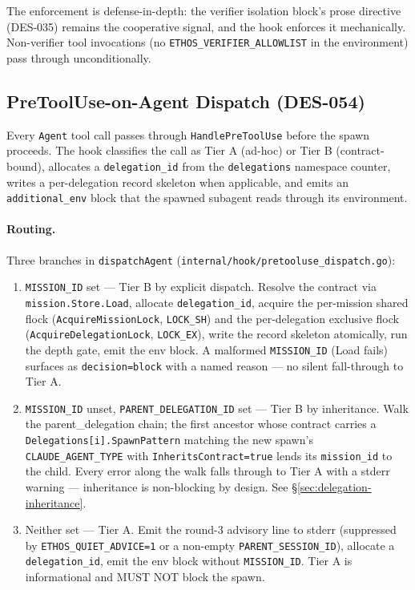 \documentclass[a4paper,10pt]{article}
\newcommand{\field}[1]{\texttt{#1}}
\newcommand{\fpath}[1]{\texttt{#1}}
\begin{document}
The enforcement is defense-in-depth: the verifier isolation block's
prose directive (DES-035) remains the cooperative signal, and the
hook enforces it mechanically.  Non-verifier tool invocations (no
\texttt{ETHOS\_VERIFIER\_ALLOWLIST} in the environment) pass through
unconditionally.

\subsection{PreToolUse-on-Agent Dispatch (DES-054)}

Every \texttt{Agent} tool call passes through
\texttt{HandlePreToolUse} before the spawn proceeds.  The hook
classifies the call as Tier A (ad-hoc) or Tier B
(contract-bound), allocates a \field{delegation\_id} from the
\texttt{delegations} namespace counter, writes a per-delegation
record skeleton when applicable, and emits an
\field{additional\_env} block that the spawned subagent reads
through its environment.

\paragraph{Routing.}  Three branches in \texttt{dispatchAgent}
(\fpath{internal/hook/pretooluse\_dispatch.go}):

\begin{enumerate}
  \item \texttt{MISSION\_ID} set --- Tier B by explicit dispatch.
    Resolve the contract via \texttt{mission.Store.Load}, allocate
    \field{delegation\_id}, acquire the per-mission shared
    flock (\texttt{AcquireMissionLock}, \texttt{LOCK\_SH}) and
    the per-delegation exclusive flock
    (\texttt{AcquireDelegationLock}, \texttt{LOCK\_EX}), write
    the record skeleton atomically, run the depth gate, emit
    the env block.  A malformed \texttt{MISSION\_ID} (Load fails)
    surfaces as \texttt{decision=block} with a named reason ---
    no silent fall-through to Tier A.
  \item \texttt{MISSION\_ID} unset, \texttt{PARENT\_DELEGATION\_ID}
    set --- Tier B by inheritance.  Walk the parent\_delegation
    chain; the first ancestor whose contract carries a
    \field{Delegations[i].SpawnPattern} matching the new spawn's
    \field{CLAUDE\_AGENT\_TYPE} with \field{InheritsContract=true}
    lends its \field{mission\_id} to the child.  Every error along
    the walk falls through to Tier A with a stderr warning ---
    inheritance is non-blocking by design.  See
    \S\ref{sec:delegation-inheritance}.
  \item Neither set --- Tier A.  Emit the round-3 advisory line to
    stderr (suppressed by \texttt{ETHOS\_QUIET\_ADVICE=1} or a
    non-empty \texttt{PARENT\_SESSION\_ID}), allocate a
    \field{delegation\_id}, emit the env block without
    \texttt{MISSION\_ID}.  Tier A is informational and MUST NOT
    block the spawn.
\end{enumerate}
\end{document}
